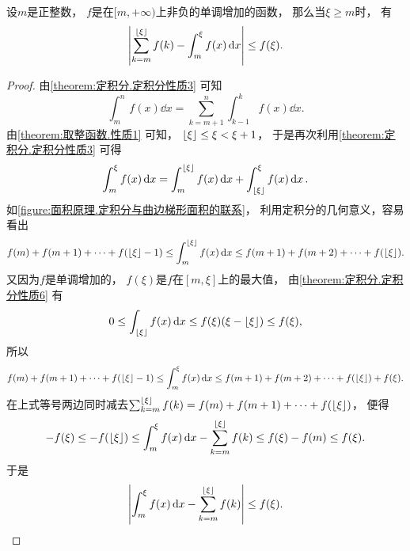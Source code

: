 \begin{theorem}
设\(m\)是正整数，
\(f\)是在\([m,+\infty)\)上非负的单调增加的函数，
那么当\(\xi \geq m\)时，
有\begin{equation*}
	\abs{
		\sum_{k=m}^{\lfloor\xi\rfloor} f(k)
		- \int_m^\xi f(x) \dd{x}
	} \leq f(\xi).
\end{equation*}
\begin{proof}
由\cref{theorem:定积分.定积分性质3} 可知\begin{equation*}
	\int_m^n f(x) \dd{x}
	= \sum_{k=m+1}^n \int_{k-1}^k f(x) \dd{x}.
\end{equation*}
由\cref{theorem:取整函数.性质1} 可知，
\(\lfloor\xi\rfloor \leq \xi < \xi + 1\)，
于是再次利用\cref{theorem:定积分.定积分性质3} 可得\begin{equation*}
	\int_m^\xi f(x) \dd{x}
	= \int_m^{\lfloor\xi\rfloor} f(x) \dd{x}
	+ \int_{\lfloor\xi\rfloor}^\xi f(x) \dd{x}.
\end{equation*}
如\cref{figure:面积原理.定积分与曲边梯形面积的联系}，
利用定积分的几何意义，容易看出\begin{equation*}
	f(m) + f(m+1) + \dotsb + f(\lfloor\xi\rfloor-1)
	\leq \int_m^{\lfloor\xi\rfloor} f(x) \dd{x}
	\leq f(m+1) + f(m+2) + \dotsb + f(\lfloor\xi\rfloor).
\end{equation*}
又因为\(f\)是单调增加的，
\(f(\xi)\)是\(f\)在\([m,\xi]\)上的最大值，
由\cref{theorem:定积分.定积分性质6} 有\begin{equation*}
	0 \leq \int_{\lfloor\xi\rfloor} f(x) \dd{x}
	\leq f(\xi) (\xi - \lfloor\xi\rfloor)
	\leq f(\xi),
\end{equation*}
所以\begin{equation*}
	f(m) + f(m+1) + \dotsb + f(\lfloor\xi\rfloor-1)
	\leq \int_m^\xi f(x) \dd{x}
	\leq f(m+1) + f(m+2) + \dotsb + f(\lfloor\xi\rfloor) + f(\xi).
\end{equation*}
在上式等号两边同时减去\(\sum_{k=m}^{\lfloor\xi\rfloor} f(k)
= f(m) + f(m+1) + \dotsb + f(\lfloor\xi\rfloor)\)，
便得\begin{equation*}
	-f(\xi)
	\leq -f(\lfloor\xi\rfloor)
	\leq \int_m^\xi f(x) \dd{x} - \sum_{k=m}^{\lfloor\xi\rfloor} f(k)
	\leq f(\xi) - f(m)
	\leq f(\xi).
\end{equation*}
于是\begin{equation*}
	\abs{\int_m^\xi f(x) \dd{x} - \sum_{k=m}^{\lfloor\xi\rfloor} f(k)} \leq f(\xi).
	\qedhere
\end{equation*}
\end{proof}
\end{theorem}

